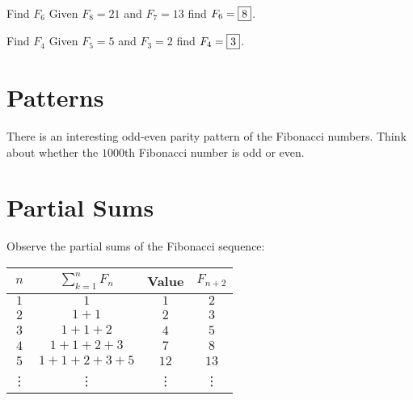 \documentclass[a4paper,10pt]{report}
\begin{document}
\begin{problem}{Find $F_6$}
 Given $F_8=21$ and $F_7=13$ find $F_6=\Ans{8}$.
\end{problem}

\begin{problem}{Find $F_4$}
 Given $F_5=5$ and $F_3=2$ find $F_4=\Ans{3}$.
\end{problem}

\section{Patterns}

There is an interesting odd-even parity pattern of the Fibonacci numbers. Think
about whether the $1000$th Fibonacci number is odd or even.

\section{Partial Sums}

Observe the partial sums of the Fibonacci sequence:

\begin{center}
 \begin{tabular}{|c|c|c|c|}
  \hline
  $n$ & $\displaystyle \sum_{k=1}^n F_n$ & Value & $F_{n+2}$ \\
  \hline
  $1$ & $1$ & $1$ & $2$ \\
  $2$ & $1+1$ & $2$ & $3$ \\
  $3$ & $1+1+2$ & $4$ & $5$ \\
  $4$ & $1+1+2+3$ & $7$ & $8$ \\
  $5$ & $1+1+2+3+5$ & $12$ & $13$ \\
  \vdots & \vdots & \vdots & \vdots \\
  \hline
 \end{tabular}
\end{center}
\end{document}
